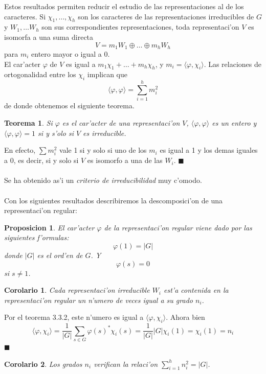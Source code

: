 \documentclass[a4paper,openright,12pt]{book}
\numberwithin{equation}{section} %
\newtheorem{teorema}{Teorema}[section] %
\newtheorem{proposicion}{Proposicion}[section] %
\newtheorem{corolario}{Corolario}[section] %
\newenvironment{proof}{\noindent{\it Demostracion:}}{\hfill$\blacksquare$} %
\begin{document}
Estos resultados permiten reducir el estudio de las representaciones al de los caracteres. Si $\chi_{1}, \ldots ,\chi_{h}$ son los caracteres de las representaciones irreducibles de $G$ y $W_{1}, \ldots W_{h}$ son sus correspondientes representaciones, toda representaci'on $V$ es isomorfa a una suma directa
\[
V=m_{1}W_{1} \oplus \ldots \oplus m_{h}W_{h}
\]
para $m_{i}$ entero mayor o igual a 0.\\
El car'acter $\varphi$ de $V$ es igual a $m_{1}\chi_{1}+\ldots + m_{h}\chi_{h}$, y $m_{i}=\langle \varphi , \chi_{i} \rangle$. Las relaciones de ortogonalidad entre los $\chi_{i}$ implican que
\[
\langle \varphi , \varphi \rangle = \sum_{i=1}^{h}m_{i}^{2}
\]
de donde obtenemos el siguiente teorema.
\begin{teorema}
Si $\varphi$ es el car'acter de una representaci'on $V$, $\langle \varphi, \varphi \rangle$ es un entero y $\langle \varphi, \varphi \rangle =1$ si y s'olo si $V$ es irreducible.
\end{teorema}
\begin{proof}
En efecto, $\sum m_{i}^{2}$ vale 1 si y solo si uno de los $m_{i}$ es igual a 1 y los demas iguales a 0, es decir, si y solo si $V$ es isomorfo a una de las $W_{i}$.
\end{proof}\\
\\
Se ha obtenido as'i un \emph{criterio de irreducibilidad} muy c'omodo.\\
\\
Con los siguientes resultados describiremos la descomposici'on de una representaci'on regular:
\begin{proposicion}
El car'acter $\varphi$ de la representaci'on regular viene dado por las siguientes f'ormulas:
\[
\varphi (1) = |G|
\]
donde $|G|$ es el ord'en de $G$. Y
\[
\varphi (s)=0
\]
si $s \neq 1$.
\end{proposicion}
\begin{corolario}
Cada representaci'on irreducible $W_{i}$ est'a contenida en la representaci'on regular un n'umero de veces igual a su grado $n_{i}$.
\end{corolario}
\begin{proof}
Por el teorema 3.3.2, este n'umero es igual a $\langle \varphi , \chi_{i} \rangle$. Ahora bien
\[
\langle \varphi , \chi_{i} \rangle = \frac{1}{|G|}\sum_{s \in G} \varphi (s)^{*} \chi_{i} (s) = \frac{1}{|G|}|G|\chi_{i}(1)=\chi_{i}(1)=n_{i} 
\]
\end{proof}
\begin{corolario}
Los grados $n_{i}$ verifican la relaci'on $\sum_{i=1}^{h}n_{i}^{2}=|G|$.
\end{corolario}
\end{document}
